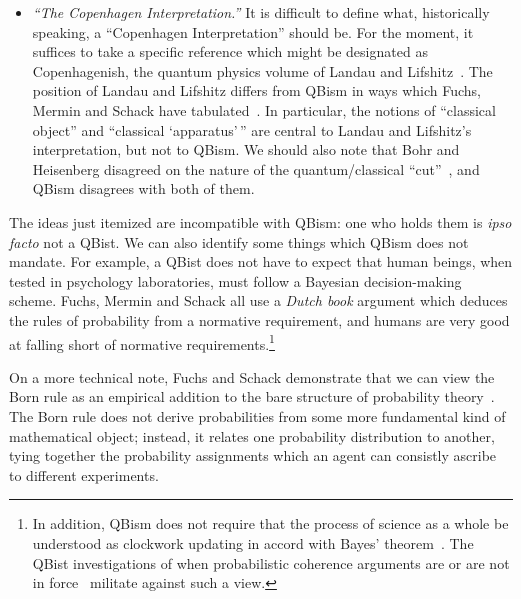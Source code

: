 \documentclass[aps,pra,superscriptaddress,12pt,tightenlines,nofootinbib]{revtex4}
\begin{document}
\begin{itemize}
\item \emph{``The Copenhagen Interpretation.''}  It is difficult to
  define what, historically speaking, a ``Copenhagen Interpretation''
  should be.  For the moment, it suffices to take a specific reference
  which might be designated as Copenhagenish, the quantum physics
  volume of Landau and Lifshitz~\cite{Landau1991}.  The position of
  Landau and Lifshitz differs from QBism in ways which Fuchs, Mermin
  and Schack have tabulated~\cite{AJP, Mermin-Vienna, Mermin-Bell}.
  In particular, the notions of ``classical object'' and ``classical
  `apparatus'\,'' are central to Landau and Lifshitz's interpretation,
  but not to QBism.  We should also note that Bohr and Heisenberg
  disagreed on the nature of the quantum/classical
  ``cut''~\cite{Camilleri2015}, and QBism disagrees with both of them.
\end{itemize}

The ideas just itemized are incompatible with QBism: one who holds
them is \emph{ipso facto} not a QBist.  We can also identify some
things which QBism does not mandate.  For example, a QBist does not
have to expect that human beings, when tested in psychology
laboratories, must follow a Bayesian decision-making scheme.  Fuchs,
Mermin and Schack all use a \emph{Dutch book} argument which deduces
the rules of probability from a normative requirement, and humans are
very good at falling short of normative requirements.\footnote{In
  addition, QBism does not require that the process of science as a
  whole be understood as clockwork updating in accord with Bayes'
  theorem~\cite[pp.\ 193, 500, 799, 1020, 1228, 1731]{Fuchs2014}.  The
  QBist investigations of when probabilistic coherence arguments are
  or are not in force~\cite{FuchsSchack2011, RMP} militate against
  such a view.}

On a more technical note, Fuchs and Schack demonstrate that we can
view the Born rule as an empirical addition to the bare structure of
probability theory~\cite{RMP}.  The Born rule does not derive
probabilities from some more fundamental kind of mathematical object;
instead, it relates one probability distribution to another, tying
together the probability assignments which an agent can consistly
ascribe to different experiments.
\end{document}
